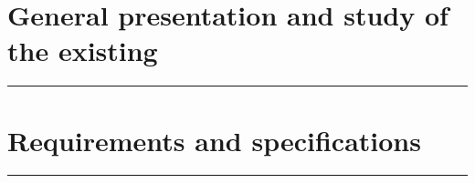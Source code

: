 \documentclass{report}
\newcommand\mylocaltableofcontents{%
\begingroup
\renewcommand*{\contentsname}{\textcolor{black}{\textbf{Contents}}\\[-1.0em]\color{black}\rule{\textwidth}{1pt}}
\setcounter{secnumdepth}{1}
\etocsettocdepth{1}

\localtableofcontents
\noindent\rule{\textwidth}{1pt}
\endgroup
}
\begin{document}
\pagestyle{fancy} 


\tableofcontents

\newpage

\listoffigures

\newpage

\listoftables

\newpage





\chapter{General presentation and study of the existing}
\mylocaltableofcontents
\newpage








\chapter{Requirements and specifications}
\mylocaltableofcontents
\newpage





%
%

\end{document}
